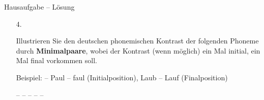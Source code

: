 \begin{frame}{Hausaufgabe -- Lösung}

\begin{itemize}	
\item[4.]{Illustrieren Sie den deutschen phonemischen Kontrast der folgenden Phoneme durch \textbf{Minimalpaare}, wobei der Kontrast (wenn möglich) ein Mal initial, ein Mal final vorkommen soll.

Beispiel: \textipa{[p]} -- \textipa{[f]} Paul -- faul (Initialposition), Laub -- Lauf (Finalposition)}

\begin{exe}
	\settowidth{}
	\begin{xlist}
		\ex \textipa{[m]} -- \textipa{[n]} 
		\ex \textipa{[p]} -- \textipa{[b]} 
		\ex \textipa{[h]} -- \textipa{[v]} 
		\ex \textipa{[n]} -- \textipa{[N]} 
		\ex \textipa{[f]} -- \textipa{[v]} 
	\end{xlist}
\end{exe}
		
\end{itemize}

\end{frame}
